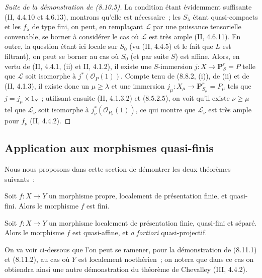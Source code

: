 \begin{proof}[Suite de la démonstration de (8.10.5)]
La condition étant évidemment suffisante (II, 4.4.10 et 4.6.13), montrons
qu'elle est nécessaire~; les $S_\lambda$ étant quasi-compacts et les
$f_\lambda$ de type fini, on peut, en remplaçant $\mathcal L$ par une puissance
tensorielle convenable, se borner à considérer le cas où $\mathcal L$ est très
ample (II, 4.6.11). En outre, la question étant ici locale sur $S_0$ (vu
(II, 4.4.5) et le fait que $L$ est filtrant), on peut se borner au cas où
$S_0$ (et par suite $S$) est affine. Alors, en vertu de (II, 4.4.1, (ii) et
II, 4.1.2), il existe une $S$-immersion
$j:X\to\mathbf P_S^r=P$ telle que $\mathcal L$ soit isomorphe à
$j^*(\mathcal O_P(1))$. Compte tenu de (8.8.2, (i)), de (ii) et de
(II, 4.1.3), il existe donc un $\mu\geq\lambda$ et une immersion
$j_\mu:X_\mu\to\mathbf P_{S_\mu}^r=P_\mu$ tels que
$j=j_\mu\times1_S$~; utilisant ensuite (II, 4.1.3.2) et (8.5.2.5), on voit
qu'il existe $\nu\geq\mu$ tel que $\mathcal L_\nu$ soit isomorphe à
$j_\nu^*(\mathcal O_{P_\nu}(1))$, ce qui montre que $\mathcal L_\nu$ est très
ample pour $f_\nu$ (II, 4.4.2).
\end{proof}

\subsection{Application aux morphismes quasi-finis}
\label{subsection:IV.8.11-fr}
\label{IV.8.11-fr}

Nous nous proposons dans cette section de démontrer les deux théorèmes
suivants~:

\begin{theorem}[8.11.1]
\label{IV.8.11.1-fr}
Soit $f:X\to Y$ un morphisme propre, localement de présentation finie, et
quasi-fini. Alors le morphisme $f$ est fini.
\end{theorem}

\begin{theorem}[8.11.2]
\label{IV.8.11.2-fr}
Soit $f:X\to Y$ un morphisme localement de présentation finie, quasi-fini et
séparé. Alors le morphisme $f$ est quasi-affine, et \emph{a fortiori}
quasi-projectif.
\end{theorem}

\begin{remark}[8.11.3]
\label{IV.8.11.3-fr}
On va voir ci-dessous que l'on peut se ramener, pour la démonstration de
(8.11.1) et (8.11.2), au cas où $Y$ est localement noethérien~; on notera que
dans ce cas on obtiendra ainsi une autre démonstration du théorème de
Chevalley (III, 4.4.2).
\end{remark}

